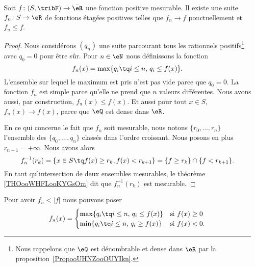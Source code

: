 \begin{lemma}    \label{LemYFoWqmS}
	Soit \( f\colon (S,\tribF)\to \bar\eR\) une fonction positive mesurable. Il existe une suite \( f_n\colon S\to \eR\) de fonctions étagées positives telles que \( f_n\to f\) ponctuellement et \( f_n \leq f\).
\end{lemma}

\begin{proof}
	Nous considérons \( (q_n)\) une suite parcourant tous les rationnels positifs\footnote{Nous rappelons que \( \eQ\) est dénombrable et dense dans \( \eR\) par la proposition~\ref{PropooUHNZooOUYIkn}.} avec \( q_0=0\) pour être sûr.
	Pour \( n\in \eN\) nous définissons la fonction
	\begin{equation}        \label{EqooXQYIooSSJwtM}
		f_n(x)= \max\{ q_i\tq i\leq n,\, q_i\leq f(x) \}.
	\end{equation}
	L'ensemble sur lequel le maximum est pris n'est pas vide parce que \( q_0=0\). La fonction \( f_n\) est simple parce qu'elle ne prend que \( n\) valeurs différentes. Nous avons aussi, par construction, \(  f_n(x)\leq f(x) \). Et aussi pour tout \( x\in S\), \( f_n(x)\to f(x)\), parce que \( \eQ\) est dense dans \( \eR\).

	En ce qui concerne le fait que \( f_n\) soit mesurable, nous notons \( \{ r_0,\ldots, r_{n} \}\) l'ensemble des \( \{ q_0,\ldots, q_n \}\) classés dans l'ordre croissant. Nous posons en plus \( r_{n+1}=+\infty\). Nous avons alors
	\begin{equation}
		f_n^{-1}(r_k)=\{ x\in S\tq f(x)\geq r_k,f(x)<r_{k+1} \}=\{ f\geq r_k \}\cap\{ f<r_{k+1} \}.
	\end{equation}
	En tant qu'intersection de deux ensembles mesurables, le théorème \ref{THOooWHFLooKYGsOm} dit que \( f_n^{-1}(r_k)\) est mesurable.
\end{proof}

\begin{remark}
	Pour avoir \(  f_n <| f |\) nous pouvons poser
	\begin{equation}
		f_n(x)=\begin{cases}
			\max\{ q_i\tq i\leq n,\, q_i\leq f(x) \} & \text{si } f(x)\geq 0      \\
			\min\{ q_i\tq i\leq n,\, q_i\geq f(x) \} & \text{si } f(x)< 0\text{.}
		\end{cases}
	\end{equation}
\end{remark}

